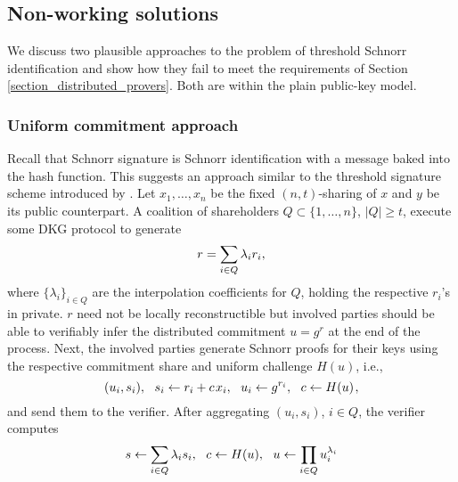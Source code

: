 \documentclass[10pt, psamsfonts, reqno]{amsart}
\theoremstyle{definition}
\theoremstyle{remark}
\numberwithin{equation}{section}
\begin{document}
\subsection{Non-working solutions}\label{section_non_working_solutions}

We discuss two plausible approaches to the
problem of threshold Schnorr identification
and show how they fail to meet
the requirements of
Section \ref{section_distributed_provers}.
Both are within the plain public-key model.

\subsubsection{Uniform commitment approach}\label{section_uniform_commitment}

Recall that Schnorr signature is
Schnorr identification with a message baked
into the hash function.
This suggests an approach similar to the
threshold signature scheme introduced
by \cite{paper_stinson_strobl}.
Let $x_1, \dots, x_n$ be the fixed
$(n,t)$-sharing of $x$ and $y$ be its public counterpart.
A coalition of shareholders $Q \subset \{1, \dots, n\}$,
$|Q| \ge t$, execute some DKG protocol to generate
\vspace{5pt}
\begin{equation*}
r = \sum_{i \in Q} \lambda_i r_i,
\vspace{5pt}
\end{equation*}
where $\{\lambda_i\}_{i \in Q}$
are the interpolation coefficients
for $Q$, holding the respective $r_i$'s in private.
$r$ need not be locally reconstructible
but involved parties should be able to
verifiably infer the distributed commitment
$u = g^r$ at the end of the process.
Next, the involved parties generate Schnorr proofs
for their keys using the respective commitment share
and uniform challenge $H(u)$, i.e.,
\vspace{5pt}
\begin{equation*}
(u_i, s_i),
\ \ s_i \leftarrow r_i + c\hspace{1pt}x_i,
\ \ u_i \leftarrow g ^ {r_i},
\ \ c \leftarrow H(u)
\hspace{1pt},
\vspace{5pt}
\end{equation*}
and send them to the verifier. 
After aggregating $(u_i, s_i)$, $i \in Q$,
the verifier computes
\vspace{5pt}
\begin{equation*}
s \leftarrow \sum_{i \in Q} \lambda_i s_i,
\ \ c \leftarrow H(u),
\ \ u \leftarrow \prod_{i \in Q} u_i ^ {\lambda_i}
\vspace{5pt}
\end{equation*}
\end{document}
